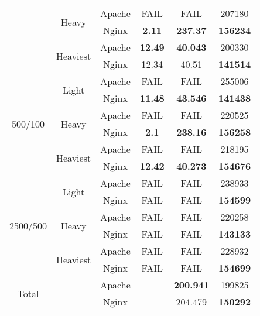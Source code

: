 \begin{table}[htbp]
\begin{tabular}{|c|c|c|c|c|c|}
 & \multirow{2}{*}{Heavy} & Apache & FAIL & FAIL & 207180\\\cline{3-6}
 &  & Nginx & \textbf{2.11} & \textbf{237.37} & \textbf{156234}\\\cline{2-6}
 & \multirow{2}{*}{Heaviest} & Apache & \textbf{12.49} & \textbf{40.043} & 200330\\\cline{3-6}
 &  & Nginx & 12.34 & 40.51 & \textbf{141514}\\\hline
\multirow{6}{*}{500/100} & \multirow{2}{*}{Light} & Apache & FAIL & FAIL & 255006\\\cline{3-6}
 &  & Nginx & \textbf{11.48} & \textbf{43.546} & \textbf{141438}\\\cline{2-6}
 & \multirow{2}{*}{Heavy} & Apache & FAIL & FAIL & 220525\\\cline{3-6}
 &  & Nginx & \textbf{2.1} & \textbf{238.16} & \textbf{156258}\\\cline{2-6}
 & \multirow{2}{*}{Heaviest} & Apache & FAIL & FAIL & 218195\\\cline{3-6}
 &  & Nginx & \textbf{12.42} & \textbf{40.273} & \textbf{154676}\\\hline
\multirow{6}{*}{2500/500} & \multirow{2}{*}{Light} & Apache & FAIL & FAIL & 238933\\\cline{3-6}
 &  & Nginx & FAIL & FAIL & \textbf{154599}\\\cline{2-6}
 & \multirow{2}{*}{Heavy} & Apache & FAIL & FAIL & 220258\\\cline{3-6}
 &  & Nginx & FAIL & FAIL & \textbf{143133}\\\cline{2-6}
 & \multirow{2}{*}{Heaviest} & Apache & FAIL & FAIL & 228932\\\cline{3-6}
 &  & Nginx & FAIL & FAIL & \textbf{154699}\\\hline
\multirow{2}{*}{Total} &  & Apache &  & \textbf{200.941} & 199825\\\cline{2-6}
 &  & Nginx &  & 204.479 & \textbf{150292}\\\hline
  \end{tabular}


  \label{tab:addlabel}
\end{table}
